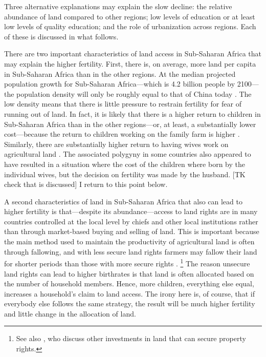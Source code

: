 \documentclass[letterpaper,12pt]{article}
\begin{document}
Three alternative explanations may explain the slow decline: the
relative abundance of land compared to other regions; low levels of
education or at least low levels of quality education; and the role of
urbanization across regions.
Each of these is discussed in what follows.

There are two important characteristics of land access in 
Sub-Saharan Africa that may explain the higher fertility.
First, there is, on average, more land per capita in Sub-Saharan Africa 
than in the other regions.
At the median projected population growth for Sub-Saharan Africa---which
is 4.2 billion people by 2100---the population density will only be
roughly equal to that of China today \citep[p 235]{Gerland2014}.
The low density means that there is little pressure to restrain
fertility for fear of running out of land.
In fact, it is likely that there is a higher return to children in
Sub-Saharan Africa than in the other regions---or, at least, a
substantially lower cost---because the return to children working on the
family farm is higher \citep{Caldwell1992,Bongaarts2013a}.
Similarly, there are substantially higher return to having wives work on
agricultural land \citep{jacoby95,Matz2016}.
The associated polygyny in some countries also appeared to have resulted 
in a situation where the cost of the children where born by the individual 
wives, but the decision on fertility was made by the husband.
[TK check that is discussed] I return to this point below.

A second characteristics of land in Sub-Saharan Africa that also can
lead to higher fertility is that---despite its abundance---access to
land rights are in many countries controlled at the local level by 
chiefs and other local institutions rather than through market-based 
buying and selling of land.
This is important because the main method used to maintain the 
productivity of agricultural land is often through fallowing, and with less
secure land rights farmers may fallow their land for shorter periods
than those with more secure rights \citep{Goldstein2008}.%
\footnote{
See also \citet{besley95c}, who discuss other investments in land that
can secure property rights.}
The reason unsecure land rights can lead to higher birthrates is that
land is often allocated based on the number of household members.
Hence, more children, everything else equal, increases a household's 
claim to land access.
The irony here is, of course, that if everybody else follows the same
strategy, the result will be much higher fertility and little change in
the allocation of land.
\end{document}
